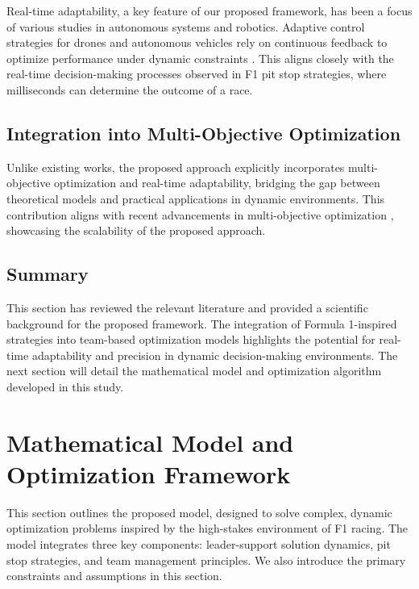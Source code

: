\documentclass[preprint,12pt]{elsarticle}
\begin{document}
Real-time adaptability, a key feature of our proposed framework, has been a focus of various studies in autonomous systems and robotics. Adaptive control strategies for drones and autonomous vehicles rely on continuous feedback to optimize performance under dynamic constraints \cite{bastin2023adaptation}. This aligns closely with the real-time decision-making processes observed in F1 pit stop strategies, where milliseconds can determine the outcome of a race.

\subsection{Integration into Multi-Objective Optimization}

Unlike existing works, the proposed approach explicitly incorporates multi-objective optimization and real-time adaptability, bridging the gap between theoretical models and practical applications in dynamic environments. This contribution aligns with recent advancements in multi-objective optimization \cite{delardes2024multiobjective}, showcasing the scalability of the proposed approach.

\subsection{Summary}

This section has reviewed the relevant literature and provided a scientific background for the proposed framework. The integration of Formula 1-inspired strategies into team-based optimization models highlights the potential for real-time adaptability and precision in dynamic decision-making environments. The next section will detail the mathematical model and optimization algorithm developed in this study.


\section{Mathematical Model and Optimization Framework}
\label{sec:model}

This section outlines the proposed model, designed to solve complex, dynamic optimization problems inspired by the high-stakes environment of F1 racing. The model integrates three key components: leader-support solution dynamics, pit stop strategies, and team management principles. We also introduce the primary constraints and assumptions in this section.
\end{document}
